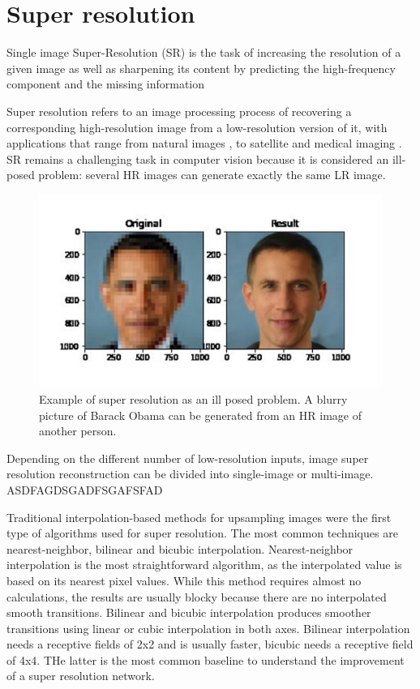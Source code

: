 \section{Super resolution} \label{sec:SR}

    Single image Super-Resolution (SR) is the task of increasing the resolution of a given image as well as sharpening its content by predicting the high-frequency component and the missing information

    Super resolution refers to an image processing process of recovering a corresponding high-resolution image from a low-resolution version of it, with applications that range from natural images \cite{zeyde2010single}, \cite{martin2001database} to satellite \cite{valsesia2021permutation} and medical imaging \cite{bashir2021comprehensive}. SR remains a challenging task in computer vision because it is considered an ill-posed problem: several HR images can generate exactly the same LR image. 

       \begin{figure}[h!]
            \centering
            \includegraphics[scale=0.2]{Includes/2-SR-ill-posed.jpg}
            \caption{Example of super resolution as an ill posed problem. A blurry picture of Barack Obama can be generated from an HR image of another person.}
            \label{fig:2-SR-ill-posed}
        \end{figure}
    
    Depending on the different number of low-resolution inputs, image super resolution reconstruction can be divided into single-image or multi-image. ASDFAGDSGADFSGAFSFAD

    Traditional interpolation-based methods for upsampling images were the first type of algorithms used for super resolution. The most common techniques are nearest-neighbor, bilinear and bicubic interpolation. Nearest-neighbor interpolation is the most straightforward algorithm, as the interpolated value is based on its nearest pixel values.  While this method requires almost no calculations, the results are usually blocky because there are no interpolated smooth transitions.
    Bilinear and bicubic interpolation produces smoother transitions using linear or cubic interpolation in both axes. Bilinear interpolation needs a receptive fields of 2x2 and is usually faster, bicubic needs a receptive field of 4x4. THe latter is the most common baseline to understand the improvement of a super resolution network. 

